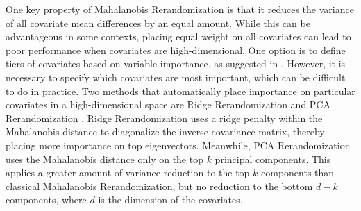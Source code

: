 \documentclass[11pt,twoside]{article}
\theoremstyle{definition}
\theoremstyle{remark}
\begin{document}
One key property of Mahalanobis Rerandomization is that it reduces the variance of all covariate mean differences by an equal amount. While this can be advantageous in some contexts, placing equal weight on all covariates can lead to poor performance when covariates are high-dimensional. One option is to define tiers of covariates based on variable importance, as suggested in \cite{morgan2015rerandomization}. However, it is necessary to specify which covariates are most important, which can be difficult to do in practice. Two methods that automatically place importance on particular covariates in a high-dimensional space are Ridge Rerandomization \citep{branson2021ridge} and PCA Rerandomization \citep{zhang2023pca}. Ridge Rerandomization uses a ridge penalty within the Mahalanobis distance to diagonalize the inverse covariance matrix, thereby placing more importance on top eigenvectors. Meanwhile, PCA Rerandomization uses the Mahalanobis distance only on the top $k$ principal components. This applies a greater amount of variance reduction to the top $k$ components than classical Mahalanobis Rerandomization, but no reduction to the bottom $d - k$ components, where $d$ is the dimension of the covariates.
\end{document}
